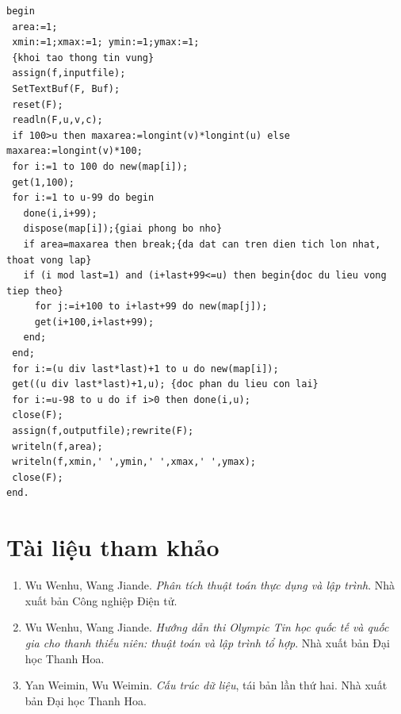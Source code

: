 \documentclass[11pt]{article}
\begin{document}
\begin{verbatim}
begin
 area:=1;
 xmin:=1;xmax:=1; ymin:=1;ymax:=1;
 {khoi tao thong tin vung}
 assign(f,inputfile);
 SetTextBuf(F, Buf);
 reset(F);
 readln(F,u,v,c);
 if 100>u then maxarea:=longint(v)*longint(u) else maxarea:=longint(v)*100;
 for i:=1 to 100 do new(map[i]);
 get(1,100);
 for i:=1 to u-99 do begin
   done(i,i+99);
   dispose(map[i]);{giai phong bo nho}
   if area=maxarea then break;{da dat can tren dien tich lon nhat, thoat vong lap}
   if (i mod last=1) and (i+last+99<=u) then begin{doc du lieu vong tiep theo}
     for j:=i+100 to i+last+99 do new(map[j]);
     get(i+100,i+last+99);
   end;
 end;
 for i:=(u div last*last)+1 to u do new(map[i]);
 get((u div last*last)+1,u); {doc phan du lieu con lai}
 for i:=u-98 to u do if i>0 then done(i,u);
 close(F);
 assign(f,outputfile);rewrite(F);
 writeln(f,area);
 writeln(f,xmin,' ',ymin,' ',xmax,' ',ymax);
 close(F);
end.
\end{verbatim}

\section{Tài liệu tham khảo}

\begin{enumerate}
  \item Wu Wenhu, Wang Jiande. \textit{Phân tích thuật toán thực dụng và lập
  trình}. Nhà xuất bản Công nghiệp Điện tử.
  \item Wu Wenhu, Wang Jiande. \textit{Hướng dẫn thi Olympic Tin học quốc tế
  và quốc gia cho thanh thiếu niên: thuật toán và lập trình tổ hợp}. Nhà xuất
  bản Đại học Thanh Hoa.
  \item Yan Weimin, Wu Weimin. \textit{Cấu trúc dữ liệu}, tái bản lần thứ
  hai. Nhà xuất bản Đại học Thanh Hoa.
\end{enumerate}
\end{document}
